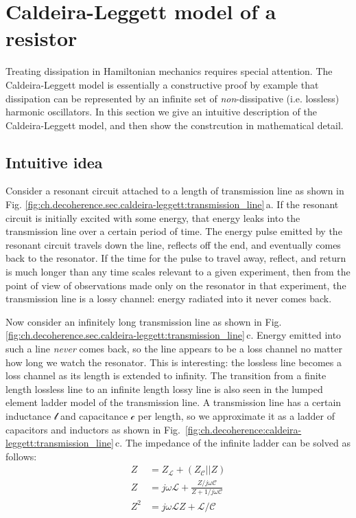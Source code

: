 \section{Caldeira-Leggett model of a resistor} \label{sec:ch.decoherence:caldeira-leggett}


Treating dissipation in Hamiltonian mechanics requires special attention.
The Caldeira-Leggett model is essentially a constructive proof by example that dissipation can be represented by an infinite set of \emph{non}-dissipative (i.e. lossless) harmonic oscillators.
In this section we give an intuitive description of the Caldeira-Leggett model, and then show the constrcution in mathematical detail.

\subsection{Intuitive idea}

Consider a resonant circuit attached to a length of transmission line as shown in Fig. \ref{fig:ch.decoherence.sec.caldeira-leggett:transmission_line}\,a.
If the resonant circuit is initially excited with some energy, that energy leaks into the transmission line over a certain period of time.
The energy pulse emitted by the resonant circuit travels down the line, reflects off the end, and eventually comes back to the resonator.
If the time for the pulse to travel away, reflect, and return is much longer than any time scales relevant to a given experiment, then from the point of view of observations made only on the resonator in that experiment, the transmission line is a lossy channel: energy radiated into it never comes back.

Now consider an infinitely long transmission line as shown in Fig. \ref{fig:ch.decoherence.sec.caldeira-leggett:transmission_line}\,c.
Energy emitted into such a line \emph{never} comes back, so the line appears to be a loss channel no matter how long we watch the resonator.
This is interesting: the lossless line becomes a loss channel as its length is extended to infinity.
The transition from a finite length lossless line to an infinite length lossy line is also seen in the lumped element ladder model of the transmission line.
A transmission line has a certain inductance $\mathcal{l}$ and capacitance $\mathcal{c}$ per length, so we approximate it as a ladder of capacitors and inductors as shown in Fig.~\ref{fig:ch.decoherence:caldeira-leggett:transmission_line}\,c.
The impedance of the infinite ladder can be solved as follows:
\begin{align}
  Z &= Z_{\mathcal{L}} + \left( Z_\mathcal{C} || Z \right) \nonumber \\
  Z &= j \omega \mathcal{L} + \frac{Z / j \omega \mathcal{C}}{Z + 1/ j \omega \mathcal{C}} \nonumber \\
  Z^2 &= j \omega \mathcal{L} Z + \mathcal{L} / \mathcal{C}
\end{align}



